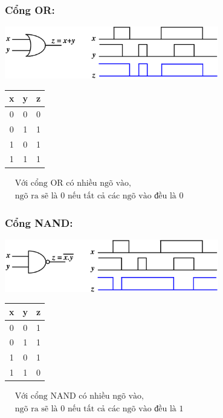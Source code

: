 \subsubsection{Cổng OR:}
\begin{center}
    \includegraphics[width = 0.7\textwidth]{./local/image/22.png}
\end{center}
\begin{table}[h!]
    \centering
    \begin{tabular}{|cc|c|}
    \hline
    \textbf{x} & \textbf{y} & \textbf{z} \\ \hline
    0          & 0          & 0                      \\
    0          & 1          & 1                      \\
    1          & 0          & 1                      \\
    1          & 1          & 1                      \\ \hline
    \end{tabular} \qquad
    $\begin{aligned}
        &\text{Với cổng OR có nhiều ngõ vào,}\\
        &\text{ngõ ra sẽ là 0 nếu tất cả các ngõ vào đều là 0}
    \end{aligned}$
\end{table}
\subsubsection{Cổng NAND:}
\begin{center}
    \includegraphics[width = 0.7\textwidth]{./local/image/23.png}
\end{center}
\begin{table}[h!]
    \centering
    \begin{tabular}{|cc|c|}
    \hline
    \textbf{x} & \textbf{y} & \textbf{z} \\ \hline
    0          & 0          & 1                      \\
    0          & 1          & 1                      \\
    1          & 0          & 1                      \\
    1          & 1          & 0                      \\ \hline
    \end{tabular} \qquad
    $\begin{aligned}
        &\text{Với cổng NAND có nhiều ngõ vào,}\\
        &\text{ngõ ra sẽ là 0 nếu tất cả các ngõ vào đều là 1}
    \end{aligned}$
\end{table}
